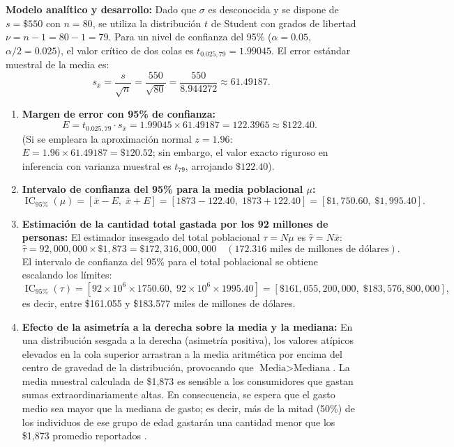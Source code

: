 {\textbf{Modelo analítico y desarrollo:}
Dado que $\sigma$ es desconocida y se dispone de $s = \$550$ con $n = 80$, se utiliza la distribución $t$ de Student con grados de libertad $\nu = n - 1 = 80 - 1 = 79$. Para un nivel de confianza del 95\% ($\alpha = 0.05$, $\alpha/2 = 0.025$), el valor crítico de dos colas es $t_{0.025, 79} = 1.99045$.
El error estándar muestral de la media es:
\[
  s_{\bar{x}} = \frac{s}{\sqrt{n}} = \frac{550}{\sqrt{80}} = \frac{550}{8.944272} \approx 61.49187.
\]
\begin{enumerate}
  \item \textbf{Margen de error con 95\% de confianza:}
  \[
    E = t_{0.025, 79} \cdot s_{\bar{x}} = 1.99045 \times 61.49187 = 122.3965 \approx \$122.40.
  \]
  (Si se empleara la aproximación normal $z = 1.96$: $E = 1.96 \times 61.49187 = \$120.52$; sin embargo, el valor exacto riguroso en inferencia con varianza muestral es $t_{79}$, arrojando $\$122.40$).
  \item \textbf{Intervalo de confianza del 95\% para la media poblacional $\mu$:}
  \[
    \operatorname{IC}_{95\%}(\mu) = [\bar{x} - E, \; \bar{x} + E] = [1873 - 122.40, \; 1873 + 122.40] = [\$1,750.60, \; \$1,995.40].
  \]
  \item \textbf{Estimación de la cantidad total gastada por los 92 millones de personas:}
  El estimador insesgado del total poblacional $\tau = N\mu$ es $\hat{\tau} = N\bar{x}$:
  \[
    \hat{\tau} = 92,000,000 \times \$1,873 = \$172,316,000,000 \quad (172.316 \text{ miles de millones de dólares}).
  \]
  El intervalo de confianza del 95\% para el total poblacional se obtiene escalando los límites:
  \[
    \operatorname{IC}_{95\%}(\tau) = [92 \times 10^6 \times 1750.60, \; 92 \times 10^6 \times 1995.40] = [\$161,055,200,000, \; \$183,576,800,000],
  \]
  es decir, entre \$161.055 y \$183.577 miles de millones de dólares.
  \item \textbf{Efecto de la asimetría a la derecha sobre la media y la mediana:}
  En una distribución sesgada a la derecha (asimetría positiva), los valores atípicos elevados en la cola superior arrastran a la media aritmética por encima del centro de gravedad de la distribución, provocando que $\text{Media} > \text{Mediana}$. La media muestral calculada de \$1,873 es sensible a los consumidores que gastan sumas extraordinariamente altas. En consecuencia, se espera que el gasto medio sea mayor que la mediana de gasto; es decir, más de la mitad (50\%) de los individuos de ese grupo de edad gastarán una cantidad menor que los \$1,873 promedio reportados \citep{holmesBusiness2023}.
\end{enumerate}

}
